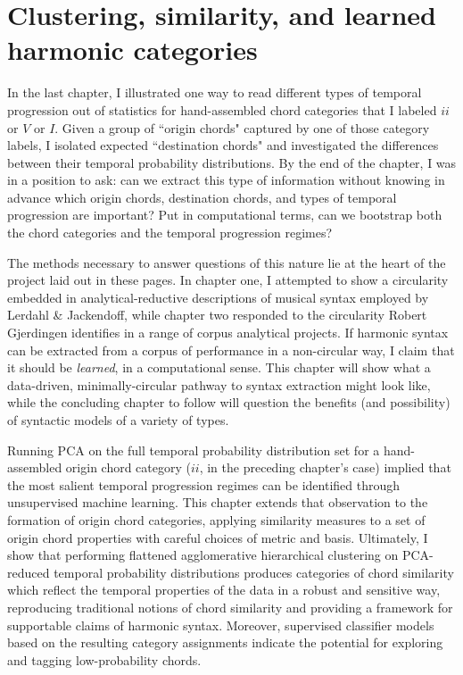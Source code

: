 \chapter{Clustering, similarity, and learned harmonic categories}
In the last chapter, I illustrated one way to read different types of temporal progression out of statistics for hand-assembled chord categories that I labeled $ii$ or $V$ or $I$.  Given a group of ``origin chords" captured by one of those category labels, I isolated expected ``destination chords" and investigated the differences between their temporal probability distributions.  By the end of the chapter, I was in a position to ask: can we extract this type of information without knowing in advance which origin chords, destination chords, and types of temporal progression are important?  Put in computational terms, can we bootstrap both the chord categories and the temporal progression regimes?

The methods necessary to answer questions of this nature lie at the heart of the project laid out in these pages.  In chapter one, I attempted to show a circularity embedded in analytical-reductive descriptions of musical syntax employed by Lerdahl \& Jackendoff, while chapter two responded to the circularity Robert Gjerdingen identifies in a range of corpus analytical projects.  If harmonic syntax can be extracted from a corpus of performance in a non-circular way, I claim that it should be \emph{learned}, in a computational sense.  This chapter will show what a data-driven, minimally-circular pathway to syntax extraction might look like, while the concluding chapter to follow will question the benefits (and possibility) of syntactic models of a variety of types.

Running PCA on the full temporal probability distribution set for a hand-assembled origin chord category ($ii$, in the preceding chapter's case) implied that the most salient temporal progression regimes can be identified through unsupervised machine learning.  This chapter extends that observation to the formation of origin chord categories, applying similarity measures to a set of origin chord properties with careful choices of metric and basis.  Ultimately, I show that performing flattened agglomerative hierarchical clustering on PCA-reduced temporal probability distributions produces categories of chord similarity which reflect the temporal properties of the data in a robust and sensitive way, reproducing traditional notions of chord similarity and providing a framework for supportable claims of harmonic syntax.  Moreover, supervised classifier models based on the resulting category assignments indicate the potential for exploring and tagging low-probability chords.

